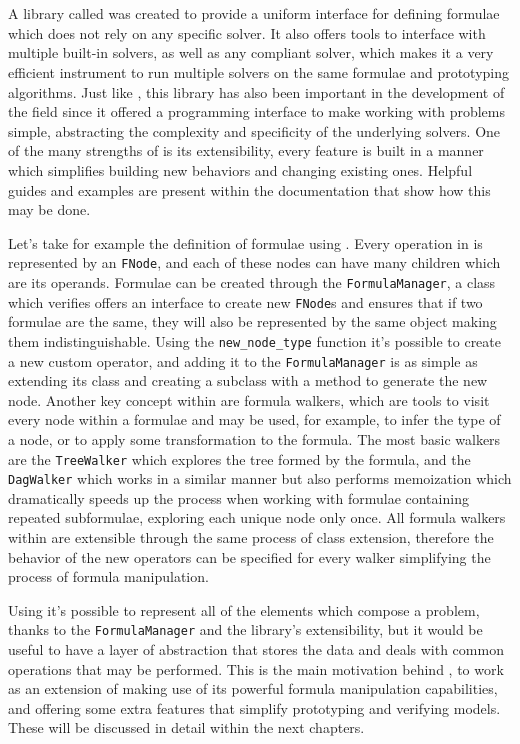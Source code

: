 \section{\pysmt{}}
A \python{} library called \pysmt{} \cite{pysmt2015} was created to provide a uniform interface for defining \smt{} formulae which does not rely on any specific solver.
It also offers tools to interface with multiple built-in solvers, as well as any \smtlib{} compliant solver, which makes it a very efficient instrument to run multiple solvers on the same formulae and prototyping algorithms.
Just like \smtlib{}, this library has also been important in the development of the field since it offered a programming interface to make working with \smt{} problems simple, abstracting the complexity and specificity of the underlying solvers.
One of the many strengths of \pysmt{} is its extensibility, every feature is built in a manner which simplifies building new behaviors and changing existing ones.
Helpful guides and examples are present within the documentation that show how this may be done.

Let's take for example the definition of formulae using \pysmt{}. Every operation in \pysmt{} is represented by an \texttt{FNode}, and each of these nodes can have many children which are its operands.
Formulae can be created through the \texttt{FormulaManager}, a class which verifies offers an interface to create new \texttt{FNode}s and ensures that if two formulae are the same, they will also be represented by the same \python{} object making them indistinguishable.
Using the \texttt{new\_node\_type} function it's possible to create a new custom operator, and adding it to the \texttt{FormulaManager} is as simple as extending its class and creating a subclass with a method to generate the new node.
Another key concept within \pysmt{} are formula walkers, which are tools to visit every node within a formulae and may be used, for example, to infer the type of a node, or to apply some transformation to the formula.
The most basic walkers are the \texttt{TreeWalker} which explores the tree formed by the formula, and the \texttt{DagWalker} which works in a similar manner but also performs memoization which dramatically speeds up the process when working with formulae containing repeated subformulae, exploring each unique node only once.
All formula walkers within \pysmt{} are extensible through the same process of class extension, therefore the behavior of the new operators can be specified for every walker simplifying the process of formula manipulation.

Using \pysmt{} it's possible to represent all of the elements which compose a \vmt{} problem, thanks to the \texttt{FormulaManager} and the library's extensibility, but it would be useful to have a layer of abstraction that stores the data and deals with common operations that may be performed.
This is the main motivation behind \pyvmt{}, to work as an extension of \pysmt{} making use of its powerful formula manipulation capabilities, and offering some extra features that simplify prototyping and verifying models. These will be discussed in detail within the next chapters.

